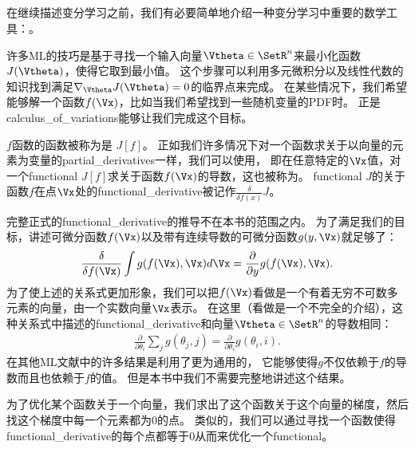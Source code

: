\subsection{}
\label{sec:calculus_of_variations}

在继续描述变分学习之前，我们有必要简单地介绍一种变分学习中重要的数学工具：。


许多\gls{ML}的技巧是基于寻找一个输入向量$\Vtheta\in\SetR^n$来最小化函数$J(\Vtheta)$，使得它取到最小值。
这个步骤可以利用多元微积分以及线性代数的知识找到满足$\nabla_{\Vtheta} J(\Vtheta) = 0$的临界点来完成。
在某些情况下，我们希望能够解一个函数$f(\Vx)$，比如当我们希望找到一些随机变量的\gls{PDF}时。
正是\gls{calculus_of_variations}能够让我们完成这个目标。



$f$函数的函数被称为是 $J[f]$。
正如我们许多情况下对一个函数求关于以向量的元素为变量的\gls{partial_derivatives}一样，我们可以使用，
即在任意特定的$\Vx$值，对一个\gls{functional} $J[f]$求关于函数$f(\Vx)$的导数，这也被称为。
\gls{functional} $J$的关于函数$f$在点$\Vx$处的\gls{functional_derivative}被记作$\frac{\delta}{\delta f(x)}J$。



完整正式的\gls{functional_derivative}的推导不在本书的范围之内。
为了满足我们的目标，讲述可微分函数$f(\Vx)$以及带有连续导数的可微分函数$g(y,\Vx)$就足够了：
\begin{align}
	\frac{\delta}{\delta f(\Vx)} \int g(f(\Vx),\Vx)d\Vx = \frac{\partial}{\partial y}g(f(\Vx),\Vx).
\end{align}
为了使上述的关系式更加形象，我们可以把$f(\Vx)$看做是一个有着无穷不可数多元素的向量，由一个实数向量$\Vx$表示。
在这里（看做是一个不完全的介绍），这种关系式中描述的\gls{functional_derivative}和向量$\Vtheta\in\SetR^n$的导数相同：
\begin{align}
	\frac{\partial}{\partial \theta_i}\sum_{j}^{}g(\theta_j,j) = \frac{\partial}{\partial \theta_i}g(\theta_i,i).
\end{align}
在其他\gls{ML}文献中的许多结果是利用了更为通用的，
它能够使得$g$不仅依赖于$f$的导数而且也依赖于$f$的值。
但是本书中我们不需要完整地讲述这个结果。


为了优化某个函数关于一个向量，我们求出了这个函数关于这个向量的梯度，然后找这个梯度中每一个元素都为$0$的点。
类似的，我们可以通过寻找一个函数使得\gls{functional_derivative}的每个点都等于$0$从而来优化一个\gls{functional}。


